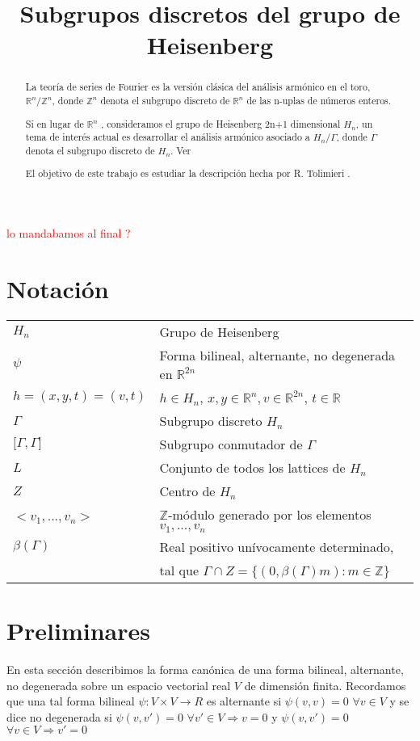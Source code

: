 \documentclass[12pt]{article}
\title{Subgrupos discretos del grupo de Heisenberg }
\date{}
\begin{document}
\maketitle

\begin{abstract}
La teoría de series de Fourier es la versión clásica del análisis armónico en el toro,
$\mathbb{R}^n /\mathbb{Z}^n$, donde $\mathbb{Z}^n$ denota el subgrupo discreto de $\mathbb{R}^n$ de
las n-uplas de números enteros.

Si en lugar de $\mathbb{R}^n$ , consideramos el grupo de Heisenberg 2n+1 dimensional $H_n$, un tema
de interés actual es desarrollar el análisis armónico asociado a $H_n/\Gamma$, donde $\Gamma$ 
denota el subgrupo discreto de $H_n$. Ver \cite{Th} 

El objetivo de este trabajo es estudiar la descripción hecha por R. Tolimieri \cite{To}.

\end{abstract}

\textcolor{red}{lo mandabamos al final ?}
\section{Notación}
\begin{tabular}{ l l }
  $H_n$ & Grupo de Heisenberg \\
  $\psi$ & Forma bilineal, alternante, no degenerada  en $\mathbb{R}^{2n}$ \\
  $h=(x,y,t)=(v,t)$ & $h \in H_n$, $x,y \in \mathbb{R}^n,v \in \mathbb{R}^{2n}$, $t \in \mathbb{R}$ \\
  $\Gamma$ & Subgrupo discreto $H_n$ \\
  ${[}\Gamma,\Gamma{]}$ & Subgrupo conmutador de $\Gamma$ \\
  $L$ & Conjunto de todos los lattices de $H_n$ \\
  $Z$ & Centro de $H_n$ \\
  $<v_1,...,v_n>$ & $\mathbb{Z}$-módulo generado por los elementos $v_1,...,v_n$\\
  $\beta(\Gamma)$ & Real positivo unívocamente determinado,\\  
  & tal que $\Gamma \cap Z =\{(0,\beta(\Gamma) m): m\in \mathbb{Z} \}$ \\
\end{tabular}


 

\section{Preliminares}
En esta sección describimos la forma canónica de una forma bilineal,
alternante, no degenerada sobre un espacio vectorial real $V$ de dimensión finita. 
Recordamos que una tal forma bilineal $\psi :V\times V\rightarrow R$
es alternante si $\psi(v,v)=0$ $\forall v \in V$  y se dice no degenerada si 
$\psi(v,v')=0$ $\forall v' \in V \Rightarrow v = 0$  y 
$\psi(v,v')=0$ $\forall v \in V \Rightarrow v' = 0$
\end{document}
